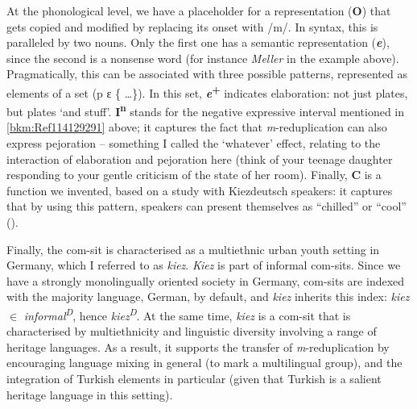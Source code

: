 At the phonological level, we have a placeholder for a representation (\textbf{O}) that gets copied and modified by replacing its onset with /m/. In syntax, this is paralleled by two nouns. Only the first one has a semantic representation (\textbf{\textit{e}}), since the second is a nonsense word (for instance \textit{Meller} in the example above). Pragmatically, this can be associated with three possible patterns, represented as elements of a set (p ε \{ …\}). In this set, \textbf{\textit{e}}\textbf{\textsuperscript{+}} indicates elaboration: not just plates, but plates ‘and stuff’. \textbf{I\textsuperscript{n}} stands for the negative expressive interval mentioned in \ref{bkm:Ref114129291} above; it captures the fact that \textit{m}{}-reduplication can also express pejoration – something I called the ‘whatever’ effect, relating to the interaction of elaboration and pejoration here (think of your teenage daughter responding to your gentle criticism of the state of her room). Finally, \textbf{C} is a function we invented, based on a study with Kiezdeutsch speakers: it captures that by using this pattern, speakers can present themselves as “chilled” or “cool” (\citealt{WiesePolat2016}).

Finally, the com-sit is characterised as a multiethnic urban youth setting in Germany, which I referred to as \textit{kiez}. \textit{Kiez} is part of informal com-sits. Since we have a strongly monolingually oriented society in Germany, com-sits are indexed with the majority language, German, by default, and \textit{kiez} inherits this index: \textit{kiez} ${\in}$ \textit{informal\textsuperscript{D}}, hence \textit{kiez\textsuperscript{D}}. At the same time, \textit{kiez} is a com-sit that is characterised by multiethnicity and linguistic diversity involving a range of heritage languages. As a result, it supports the transfer of \textit{m}{}-reduplication by encouraging language mixing in general (to mark a multilingual group), and the integration of Turkish elements in particular (given that Turkish is a salient heritage language in this setting).

